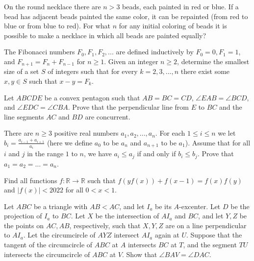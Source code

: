 \documentclass[11pt]{scrartcl}
\begin{document}
\begin{problem}[6975633259976638169]
On the round necklace there are $n> 3$ beads, each painted in red or blue. If a bead has adjacent beads painted the same color, it can be repainted (from red to blue or from blue to red). For what $n$ for any initial coloring of beads it is possible to make a necklace in which all beads are painted equally?
\end{problem}
\begin{problem}[6978535805224432571]
	The Fibonacci numbers $F_0, F_1, F_2, . . .$ are defined inductively by $F_0=0, F_1=1$, and $F_{n+1}=F_n+F_{n-1}$ for $n \ge 1$. Given an integer $n \ge 2$, determine the smallest size of a set $S$ of integers such that for every $k=2, 3, . . . , n$ there exist some $x, y \in S$ such that $x-y=F_k$.
\end{problem}
\begin{problem}[6980917169184912998]
Let $ABCDE$ be a convex pentagon such that $AB=BC=CD$, $\angle{EAB}=\angle{BCD}$, and $\angle{EDC}=\angle{CBA}$. Prove that the perpendicular line from $E$ to $BC$ and the line segments $AC$ and $BD$ are concurrent.
\end{problem}
\begin{problem}[7003931234708262274]
There are $n \ge 3$ positive real numbers $a_1, a_2, \dots, a_n$. For each $1 \le i \le n$ we let $b_i = \frac{a_{i-1} + a_{i+1}}{a_i}$ (here we define $a_0$ to be $a_n$ and $a_{n+1}$ to be $a_1$). Assume that for all $i$ and $j$ in the range $1$ to $n$, we have $a_i \le a_j$ if and only if $b_i \le b_j$.
Prove that $a_1 = a_2 = \dots = a_n$.
\end{problem}
\begin{problem}[7016087217872166929]
Find all functions $f: \mathbb{R} \rightarrow \mathbb{R}$ such that $f(yf(x))+f(x-1)=f(x)f(y)$ and $|f(x)|<2022$ for all $0<x<1$.
\end{problem}
\begin{problem}[7017112574129036660]
	Let $ABC$ be a triangle with $AB<AC$, and let $I_a$ be its $A$-excenter. Let $D$ be the projection of $I_a$ to $BC$. Let $X$ be the intersection of $AI_a$ and $BC$, and let $Y,Z$ be the points on $AC,AB$, respectively, such that $X,Y,Z$ are on a line perpendicular to $AI_a$. Let the circumcircle of $AYZ$ intersect $AI_a$ again at $U$. Suppose that the tangent of the circumcircle of $ABC$ at $A$ intersects $BC$ at $T$, and the segment $TU$ intersects the circumcircle of $ABC$ at $V$. Show that $\angle BAV=\angle DAC$.
\end{problem}
\end{document}
